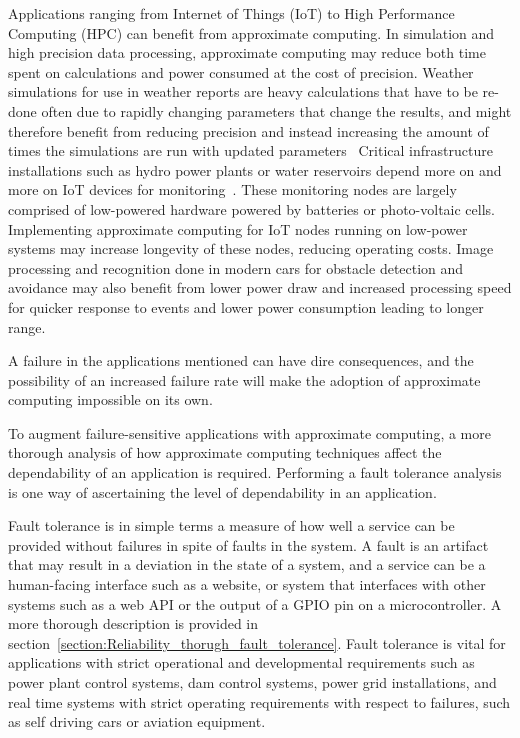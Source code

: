 Applications ranging from  Internet of Things (IoT) to High Performance Computing (HPC) can benefit from approximate computing. In simulation and high precision data processing, approximate computing may reduce both time spent on calculations and power consumed at the cost of precision. Weather simulations for use in weather reports are heavy calculations that have to be re-done often due to rapidly changing parameters that change the results, and might therefore benefit from reducing precision and instead increasing the amount of times the simulations are run with updated parameters~\citep{climatemodel}
Critical infrastructure installations such as hydro power plants or water reservoirs depend more on and more on IoT devices for monitoring~\citep{watertight_jaatun}. These monitoring nodes are largely comprised of low-powered hardware powered by batteries %
or photo-voltaic cells. Implementing approximate computing for IoT nodes running on low-power systems may increase longevity of these nodes, reducing operating costs. Image processing and recognition done in modern cars for obstacle detection and avoidance may also benefit from lower power draw and increased processing speed for quicker response to events and lower power consumption leading to longer range. %

A failure in the applications mentioned can have dire consequences, and the possibility of an increased failure rate will make the adoption of approximate computing impossible on its own.

To augment failure-sensitive applications with approximate computing, a more thorough analysis of how approximate computing techniques affect the dependability of an application is required. Performing a fault tolerance analysis is one way of ascertaining the level of dependability in an application.

Fault tolerance is in simple terms a measure of how well a service can be provided without failures in spite of faults in the system. A fault is an artifact that may result in a deviation in the state of a system, and a service can be a human-facing interface such as a website, or system that interfaces with other systems such as a web API or the output of a GPIO pin on a microcontroller. A more thorough description is provided in section~\ref{section:Reliability_thorugh_fault_tolerance}. Fault tolerance is vital for applications with strict operational and developmental requirements such as power plant control systems, dam control systems, power grid installations, and real time systems with strict operating requirements with respect to failures, such as self driving cars or aviation equipment. 

